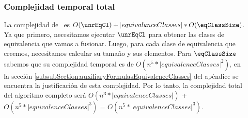 
\subsubsection{Complejidad temporal total}

 La complejidad de \eqClassSizes \ es  $O(\unrEqCl) + |equivalenceClasses| * O(\eqClassSize)$. Ya que primero, necesitamos ejecutar $\unrEqCl$ para obtener las clases de equivalencia que vamos a fusionar. Luego, para cada clase de equivalencia que creemos, necesitamos calcular su tamaño y sus elementos. Para  $\eqClassSize$ sabemos que su complejidad temporal es de $O(n^5 * |equivalenceClasses|^2)$, en la sección \ref{subsubSection:auxiliaryFormulasEquivalenceClasses} del apéndice se encuentra la justificación de esta complejidad. Por lo tanto, la complejidad total del algoritmo completo será $O(n^3 * |equivalenceClasses|)$ + $O(n^5 * |equivalenceClasses|^3)$ = $O(n^5 * |equivalenceClasses|^3)$.





